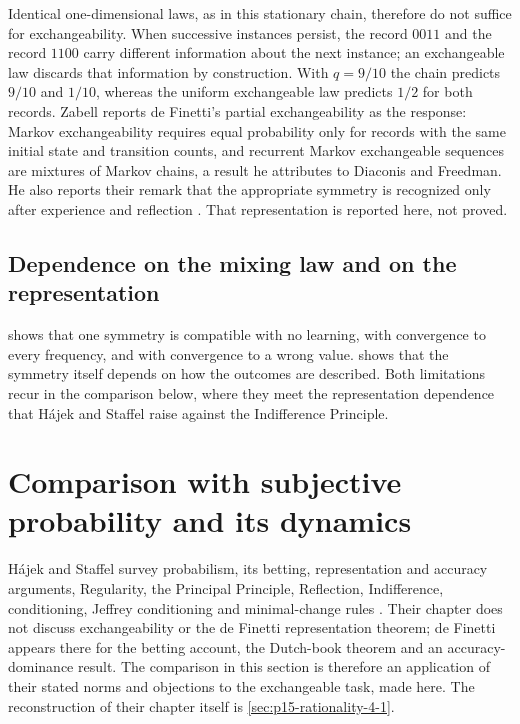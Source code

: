 Identical one-dimensional laws, as in this stationary chain, therefore do
not suffice for exchangeability. When successive instances persist,
the record \(0011\) and the record \(1100\) carry different information
about the next instance; an exchangeable law discards that information by
construction. With \(q=9/10\) the chain predicts \(9/10\) and \(1/10\),
whereas the uniform exchangeable law predicts \(1/2\) for both records.
Zabell reports de Finetti's partial exchangeability as the response:
Markov exchangeability requires equal probability only for records with the
same initial state and transition counts, and recurrent Markov exchangeable
sequences are mixtures of Markov chains, a result he attributes to Diaconis
and Freedman. He also reports their remark that the appropriate symmetry is
recognized only after experience and reflection
\cite[pp.~289--290]{Zabell2011CarnapInductiveInference}. That representation
is reported here, not proved.

\subsection{Dependence on the mixing law and on the representation}

 shows that one symmetry is compatible
with no learning, with convergence to every frequency, and with convergence
to a wrong value.  shows that the
symmetry itself depends on how the outcomes are described. Both limitations
recur in the comparison below, where they meet the representation
dependence that H\'ajek and Staffel raise against the Indifference
Principle.

\section{Comparison with subjective probability and its dynamics}
\label{sec:p15-w02b-p15-022-comparison}

H\'ajek and Staffel survey probabilism, its betting, representation and
accuracy arguments, Regularity, the Principal Principle, Reflection,
Indifference, conditioning, Jeffrey conditioning and minimal-change rules
\cite[pp.~239--248]{HajekStaffel2021Dynamics}. Their chapter does not
discuss exchangeability or the de Finetti representation theorem; de Finetti
appears there for the betting account, the Dutch-book theorem and an
accuracy-dominance result. The comparison in this section is therefore an application of
their stated norms and objections to the exchangeable task, made here. The
reconstruction of their chapter itself is \cref{sec:p15-rationality-4-1}.

